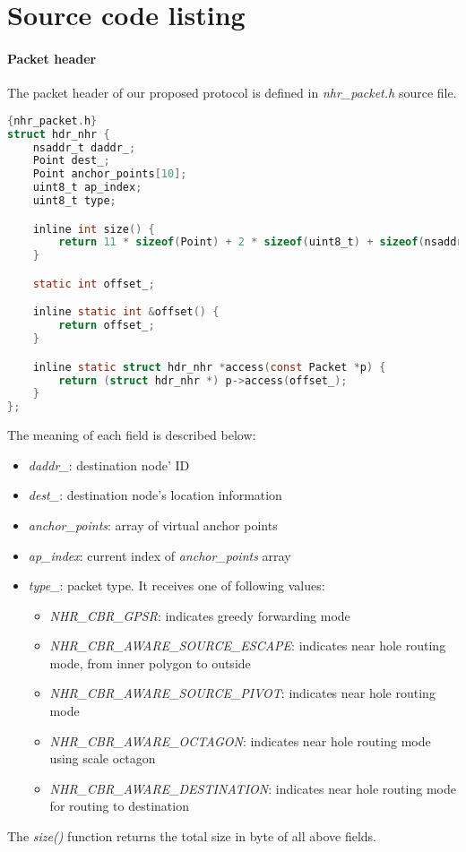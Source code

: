 \section{Source code listing}
\paragraph{Packet header \\}
The packet header of our proposed protocol is defined in \emph{nhr\_packet.h} source file. 
\begin{lstlisting}[language=C]{nhr_packet.h}
struct hdr_nhr {
    nsaddr_t daddr_;
    Point dest_;
    Point anchor_points[10];
    uint8_t ap_index;
    uint8_t type;

    inline int size() {
        return 11 * sizeof(Point) + 2 * sizeof(uint8_t) + sizeof(nsaddr_t);
    }

    static int offset_;

    inline static int &offset() {
        return offset_;
    }

    inline static struct hdr_nhr *access(const Packet *p) {
        return (struct hdr_nhr *) p->access(offset_);
    }
};
\end{lstlisting}

The meaning of each field is described below:
\begin{itemize}
\item \emph{daddr\_}: destination node' ID
\item \emph{dest\_}: destination node's location information
\item \emph{anchor\_points}: array of virtual anchor points
\item \emph{ap\_index}: current index of \emph{anchor\_points} array
\item \emph{type\_}: packet type. It receives one of following values:
\begin{itemize}
\item \emph{NHR\_CBR\_GPSR}: indicates greedy forwarding mode
\item \emph{NHR\_CBR\_AWARE\_SOURCE\_ESCAPE}: indicates near hole routing mode, from inner polygon to outside
\item \emph{NHR\_CBR\_AWARE\_SOURCE\_PIVOT}: indicates near hole routing mode
\item \emph{NHR\_CBR\_AWARE\_OCTAGON}: indicates near hole routing mode using scale octagon
\item \emph{NHR\_CBR\_AWARE\_DESTINATION}: indicates near hole routing mode for routing to destination
\end{itemize}
\end{itemize}
The \emph{size()} function returns the total size in byte of all above fields.

